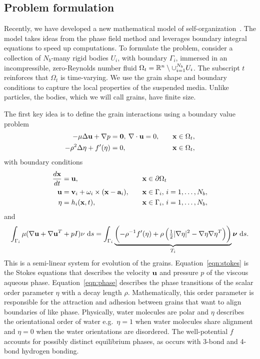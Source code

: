 \subsection{Problem formulation}
Recently, we have developed a new mathematical model of
self-organization~\cite{FuQuRyYo22,ru-ryh-qua-you2022,Fu2018_SIAM}. The
model takes ideas from the phase field method and leverages boundary
integral equations to speed up computations. To formulate the problem,
consider a collection of $N_b$-many rigid bodies $U_i$, with boundary
$\Gamma_i$, immersed in an incompressible, zero-Reynolds number fluid
$\Omega_t = \mathbb{R}^n \setminus \cup_{i=1}^{N_b} U_i$. The subscript $t$
reinforces that $\Omega_t$ is time-varying. We use the grain shape and
boundary conditions to capture the local properties of the suspended
media. Unlike particles, the bodies, which we will call grains, have
finite size.  

The first key idea is to define the grain interactions using a boundary
value problem
\begin{alignat}{3}
  -\mu\Delta \mathbf{u} + \nabla p &= \mathbf{0}, \:
  \nabla \cdot \mathbf{u} = 0, \quad &&\mathbf{x} \in \Omega_t, \label {eqn:stokes} \\
  -\rho^2 \Delta \eta + f'(\eta) &= 0, &&\mathbf{x} \in \Omega_t,
  \label{eqn:phase}
\end{alignat}
with boundary conditions
\begin{alignat}{3}
  \frac{d\mathbf{x}}{dt} &= \mathbf{u}, &&\mathbf{x} \in \partial\Omega_t \label{eqn:noslip} \\
  \mathbf{u} &= \mathbf{v}_i + \omega_i \times (\mathbf{x} - \mathbf{a}_i), \quad &&\mathbf{x} \in
  \Gamma_i,\, i=1,\ldots,N_b, \label{eqn:rbm} \\
  \eta &= h_i(\mathbf{x},t),  &&\mathbf{x} \in \Gamma_i,\, i=1,\ldots,N_b,
  \label{eqn:material}
\end{alignat}
and
\begin{align}
\int_{\Gamma_i} \mu(\nabla \uu + \nabla \uu^T + pI)\nu \,\dif s = 
\int_{\Gamma_i}
\underbrace{\left(-\rho^{-1} f'(\eta)
  + \rho\left(\tfrac{1}{2}|\nabla \eta|^2 - \nabla \eta \nabla
  \eta^T\right)\right)}_{T_i}
  \nnu \, \dif s.
  \label{eqn:stressbalance}
\end{align}
This is a semi-linear system for evolution of the grains.
Equation~\eqref{eqn:stokes} is the Stokes equations that describes the
velocity $\mathbf{u}$ and pressure $p$ of the viscous aqueous phase.
Equation~\eqref{eqn:phase} describes the phase transitions of the scalar
order parameter $\eta$ with a decay length $\rho$. Mathematically, this
order parameter is responsible for the attraction and adhesion between
grains that want to align boundaries of like phase. Physically, water
molecules are polar and $\eta$ describes the orientational order of
water e.g.~$\eta = 1$ when water molecules share alignment and $\eta =
0$ when the water orientations are disordered. The well-potential $f$
accounts for possibly distinct equilibrium phases, as occurs with 3-bond
and 4-bond hydrogen bonding.


